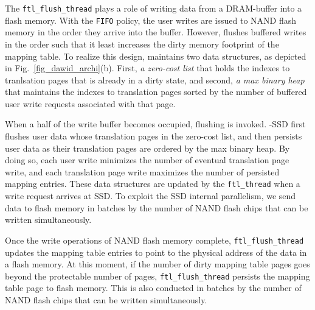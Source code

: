 The \texttt{ftl\_flush\_thread} plays a role of writing data from a DRAM-buffer
into a flash memory.  With the \texttt{FIFO} policy, the user writes are issued
to NAND flash memory in the order they arrive into the buffer. However, \ours{}
flushes buffered writes in the order such that it least increases the dirty memory
footprint of the mapping table.  To realize this design, \ours{} maintains two
data structures, as depicted in Fig.~\ref{fig_dawid_archi}(b). First, \textit{a
zero-cost list} that holds the indexes to tranlsation pages that is already
in a dirty state, and second, \textit{a max binary heap} that
maintains the indexes to translation pages sorted by the number of buffered
user write requests associated with that page.  

When a half of the write buffer becomes occupied, flushing is invoked. \ours{}-SSD
first flushes user data whose translation pages in the zero-cost list, and then
persists user data as their translation pages are ordered by the max binary
heap. By doing so, each user write minimizes the number of eventual
translation page write, and each translation page write maximizes the number of
persisted mapping entries. These data structures are updated by the \texttt{ftl\_thread} 
when a write request arrives at SSD. 
To exploit the SSD internal parallelism, we send data to flash memory in
batches by the number of NAND flash chips that can be written simultaneously.

Once the write operations of NAND flash memory complete,
\texttt{ftl\_flush\_thread} updates the mapping table entries to point to the
physical address of the data in a flash memory.  At this moment, if the number
of dirty mapping table pages goes beyond the protectable number of pages,
\texttt{ftl\_flush\_thread} persists the mapping table page to flash memory.
This is also conducted in batches by the number of NAND flash chips that can be
written simultaneously.


